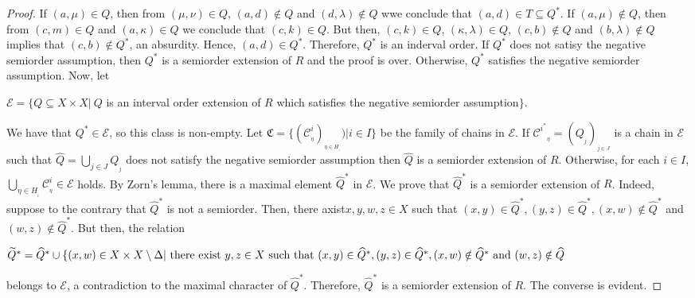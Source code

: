 \documentclass{article}
\theoremstyle{definition}
\begin{document}
\begin{proof}
If $(a,\mu)\in Q$, then from $(\mu,\nu)\in Q$, $(a,d)\notin Q$ and $(d,\lambda)\notin Q$
wwe conclude that $(a,d)\in T\subseteq Q^{\ast}$.
If $(a,\mu)\notin Q$, then from $(c,m)\in Q$ and $(a,\kappa)\in Q$ we conclude that $(c,k)\in Q$. But then, $(c,k)\in Q$, $(\kappa,\lambda)\in Q$, $(c,b)\notin Q$ and $(b,\lambda)\notin Q$ implies that $(c,b)\notin Q^{\ast}$, an absurdity. Hence, $(a,d)\in  Q^{\ast}$.
Therefore, $Q^{\ast}$ is an inderval order.
If $Q^{\ast}$ does not satisy the 
negative semiorder assumption, then $Q^{\ast}$ is a semiorder extension of $R$ and the proof is over.
Otherwise, $Q^{\ast}$ satisfies the 
negative semiorder assumption.
Now, let 
\begin{center}
$\mathcal{E}=\{Q\subseteq X\times X\vert\ Q$ 
is an interval order extension of $R$ which satisfies the 
negative semiorder assumption$\}$.
\end{center}
We have that
$Q^{\ast}\in\mathcal{E}$, so this class is non-empty.
Let $\mathfrak{C}=\{({\mathcal{C}}^i_{_\eta})_{_{\eta\in H_{_i}}})\vert i\in I\}$ be the family of chains in 
$\mathcal{E}$. If 
${{\mathcal{C}^{i^{\ast}}}}\!\!\!\!\!_{_\eta}=(Q_{_j})_{_{j\in J}}$ is a chain in $\mathcal{E}$ 
such that 
$\widehat{Q}=\displaystyle\bigcup_{j\in J}Q_{_j}$
does not satisfy the negative semiorder assumption then 
$\widehat{Q}$ is a semiorder extension of $R$. Otherwise, for each $i\in I$,
$\displaystyle\bigcup_{\eta\in H_{_i}}{\mathcal{C}}^i_{_\eta}\in \mathcal{E}$ holds.
By Zorn's lemma, there is a maximal element ${\widehat{Q}}^{\ast}$ in $\mathcal{E}$.
We prove that 
${\widehat{Q}}^{\ast}$
is a semiorder extension of $R$. 
Indeed, suppose to the contrary that ${\widehat{Q}}^{\ast}$ is not a semiorder.
Then, there axist$x, y, w, z\in X$ such that 
$(x,y)\in {\widehat{Q}}^{\ast}, (y,z)\in {\widehat{Q}}^{\ast}, (x,w)\notin {\widehat{Q}}^{\ast}$
and
$(w,z)\notin {\widehat{Q}}^{\ast}$.
But then, the relation
\begin{center}
${\widetilde{Q}}^{\ast}={\widehat{Q}}^{\ast}\cup\{(x,w)\in X\times X\setminus \Delta \vert\ {\rm there\ exist}\ 
y, z\in X\ {\rm such\ that}
\ (x,y)\in {\widehat{Q}}^{\ast}, (y,z)\in {\widehat{Q}}^{\ast}, (x,w)\notin {\widehat{Q}}^{\ast}\ {\rm and}\ 
(w,z)\notin {\widehat{Q}}$
\end{center}
belongs to $\mathcal{E}$, a contradiction to the maximal character of 
${\widehat{Q}}^{\ast}$.
Therefore, ${\widehat{Q}}^{\ast}$ is a semiorder extension of $R$.
The converse is evident.
\end{proof}
\end{document}
